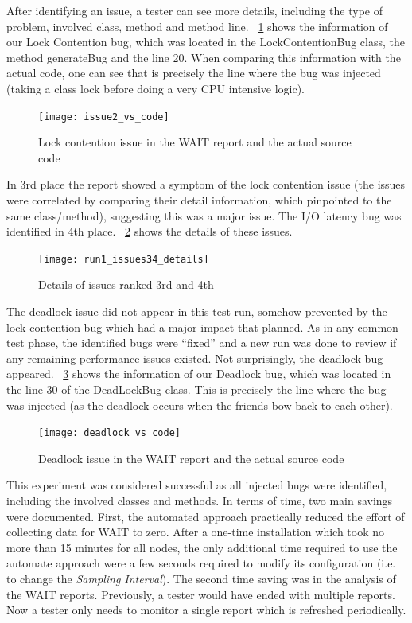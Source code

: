 \documentclass[runningheads,a4paper]{llncs}
\begin{document}
After identifying an issue, a tester can see more details, including the type of
problem, involved class, method and method line. \figurename
~\ref{fig_issue2_vs_code} shows the information of our Lock Contention bug,
which was located in the LockContentionBug class, the method generateBug and the
line 20. When comparing this information with the actual code, one can see that
is precisely the line where the bug was injected (taking a class lock before
doing a very CPU intensive logic).

\begin{figure}[!h]
\centering
\texttt{[image: issue2\_vs\_code]}
\caption{Lock contention issue in the WAIT report and the actual source code}
\label{fig_issue2_vs_code}
\end{figure}

In 3rd place the report showed a symptom of the lock contention issue
(the issues were correlated by comparing their detail information, which
pinpointed to the same class/method), suggesting this was a major issue. The I/O
latency bug was identified in 4th place. \figurename ~\ref{fig_issues34} shows
the details of these issues.

\begin{figure}[!h]
\centering
\texttt{[image: run1\_issues34\_details]}
\caption{Details of issues ranked 3rd and 4th}
\label{fig_issues34}
\end{figure}

The deadlock issue did not appear in this test run, somehow prevented by the
lock contention bug which had a major impact that planned. As in any common
test phase, the identified bugs were ``fixed'' and a new run was done to review
if any remaining performance issues existed. Not surprisingly, the deadlock bug
appeared. \figurename ~\ref{fig_dlissue_vs_code} shows the information of our
Deadlock bug, which was located in the line 30 of the DeadLockBug class. This is
precisely the line where the bug was injected (as the deadlock occurs when the
friends bow back to each other).
\vspace{-5pt}
\begin{figure}[!h]
\centering
\texttt{[image: deadlock\_vs\_code]}
\caption{Deadlock issue in the WAIT report and the
actual source code}
\label{fig_dlissue_vs_code}
\end{figure}
\vspace{-5pt}

This experiment was considered successful as all injected bugs were identified,
including the involved classes and methods. In terms of time, two main savings
were documented. First, the automated approach practically reduced the effort of
collecting data for WAIT to zero. After a one-time installation which took no
more than 15 minutes for all nodes, the only additional time required to use 
the automate approach were a few seconds required to modify its configuration
(i.e. to change the \emph{Sampling Interval}). The second time saving was in the
analysis of the WAIT reports. Previously, a tester would have ended with
multiple reports. Now a tester only needs to monitor a single report which is 
refreshed periodically.
\end{document}
